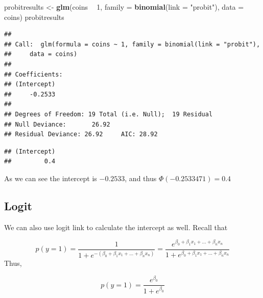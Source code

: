 \documentclass[]{book}
\newenvironment{Shaded}{\begin{snugshade}}{\end{snugshade}}
\newcommand{\DataTypeTok}[1]{\textcolor[rgb]{0.13,0.29,0.53}{#1}}
\newcommand{\DecValTok}[1]{\textcolor[rgb]{0.00,0.00,0.81}{#1}}
\newcommand{\KeywordTok}[1]{\textcolor[rgb]{0.13,0.29,0.53}{\textbf{#1}}}
\newcommand{\NormalTok}[1]{#1}
\newcommand{\OperatorTok}[1]{\textcolor[rgb]{0.81,0.36,0.00}{\textbf{#1}}}
\newcommand{\StringTok}[1]{\textcolor[rgb]{0.31,0.60,0.02}{#1}}
\begin{document}
\begin{Shaded}
\begin{Highlighting}[]
\NormalTok{probitresults <-}\StringTok{ }\KeywordTok{glm}\NormalTok{(coins }\OperatorTok{~}\StringTok{ }\DecValTok{1}\NormalTok{, }\DataTypeTok{family =} \KeywordTok{binomial}\NormalTok{(}\DataTypeTok{link =} \StringTok{"probit"}\NormalTok{), }\DataTypeTok{data =}\NormalTok{ coins)}
\NormalTok{probitresults}
\end{Highlighting}
\end{Shaded}

\begin{verbatim}
## 
## Call:  glm(formula = coins ~ 1, family = binomial(link = "probit"), 
##     data = coins)
## 
## Coefficients:
## (Intercept)  
##     -0.2533  
## 
## Degrees of Freedom: 19 Total (i.e. Null);  19 Residual
## Null Deviance:       26.92 
## Residual Deviance: 26.92     AIC: 28.92
\end{verbatim}

\begin{Shaded}
\end{Shaded}

\begin{verbatim}
## (Intercept) 
##         0.4
\end{verbatim}

As we can see the intercept is \(-0.2533\), and thus \(\Phi(-0.2533471)=0.4\)

\hypertarget{logit-1}{%
\subsection{Logit}\label{logit-1}}

We can also use logit link to calculate the intercept as well. Recall that

\[p(y=1)=\frac{1}{1+e^{-(\beta_0+\beta_1x_1+...+\beta_nx_n)}}=\frac{e^{\beta_0+\beta_1x_1+...+\beta_nx_n}}{1+e^{\beta_0+\beta_1x_1+...+\beta_nx_n}}\]
Thus,

\[p(y=1)=\frac{e^{\beta_0}}{1+e^{\beta_0}}\]

\begin{Shaded}
\end{Shaded}
\end{document}
